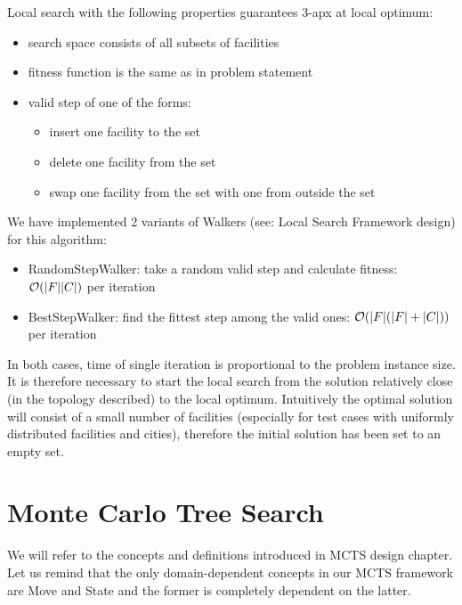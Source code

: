 Local search with the following properties
guarantees\cite{FacilityLS} %
3-apx at local optimum:
\begin{itemize}
\item search space consists of all subsets of facilities
\item fitness function is the same as in problem statement
\item valid step of one of the forms:
	\begin{itemize}
	\item insert one facility to the set
	\item delete one facility from the set
	\item swap one facility from the set with one from outside the set
	\end{itemize}
\end{itemize}

We have implemented 2 variants of Walkers (see: Local Search Framework design)
for this algorithm:
\begin{itemize}
\item RandomStepWalker: take a random valid step and calculate fitness: $\mathcal{O}(|F||C|)$ per iteration
\item BestStepWalker: find the fittest step among the valid ones: $\mathcal{O}(|F|(|F|+|C|))$ per iteration
\end{itemize}

In both cases, time of single iteration is proportional to the problem
instance size. It is therefore necessary to start the local search from
the solution relatively close (in the topology described) to the local
optimum. Intuitively the optimal solution will consist of a small number
of facilities (especially for test cases with uniformly distributed facilities and cities),
therefore the initial solution has been set to an empty set.

\section{\label{MCTS_FL}Monte Carlo Tree Search}

We will refer to the concepts and definitions introduced in MCTS design
chapter. Let us remind that the only domain-dependent concepts in our MCTS
framework are Move and State and the former is completely dependent on the
latter.

